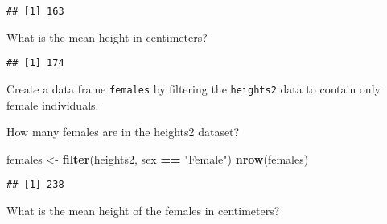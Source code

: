 \documentclass[]{article}
\newenvironment{Shaded}{\begin{snugshade}}{\end{snugshade}}
\newcommand{\CommentTok}[1]{\textcolor[rgb]{0.56,0.35,0.01}{\textit{#1}}}
\newcommand{\DataTypeTok}[1]{\textcolor[rgb]{0.13,0.29,0.53}{#1}}
\newcommand{\DecValTok}[1]{\textcolor[rgb]{0.00,0.00,0.81}{#1}}
\newcommand{\FloatTok}[1]{\textcolor[rgb]{0.00,0.00,0.81}{#1}}
\newcommand{\KeywordTok}[1]{\textcolor[rgb]{0.13,0.29,0.53}{\textbf{#1}}}
\newcommand{\NormalTok}[1]{#1}
\newcommand{\OperatorTok}[1]{\textcolor[rgb]{0.81,0.36,0.00}{\textbf{#1}}}
\newcommand{\StringTok}[1]{\textcolor[rgb]{0.31,0.60,0.02}{#1}}
\begin{document}
\begin{Shaded}
\end{Shaded}

\begin{verbatim}
## [1] 163
\end{verbatim}

What is the mean height in centimeters?

\begin{Shaded}
\end{Shaded}

\begin{verbatim}
## [1] 174
\end{verbatim}

Create a data frame \texttt{females} by filtering the \texttt{heights2}
data to contain only female individuals.

How many females are in the heights2 dataset?

\begin{Shaded}
\begin{Highlighting}[]
\NormalTok{females <-}\StringTok{ }\KeywordTok{filter}\NormalTok{(heights2, sex }\OperatorTok{==}\StringTok{ "Female"}\NormalTok{)}
\KeywordTok{nrow}\NormalTok{(females)}
\end{Highlighting}
\end{Shaded}

\begin{verbatim}
## [1] 238
\end{verbatim}

What is the mean height of the females in centimeters?

\begin{Shaded}
\end{Shaded}
\end{document}
